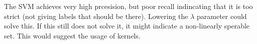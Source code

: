 \documentclass{article}
\begin{document}
The SVM achieves very high prcesision, but poor recall indincating that it is too strict (not giving labels that should be there). Lowering the $\lambda$ parameter could solve this. If this still does not solve it, it might indicate a non-linearly sperable set. This would suggest the usage of kernels.


\printbibliography
\end{document}
